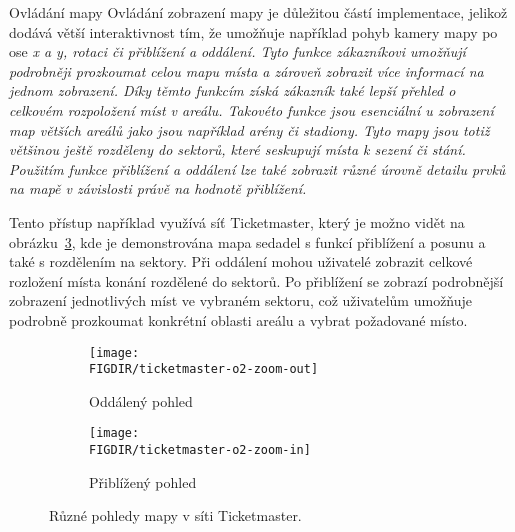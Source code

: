 \begin{subsection}{Ovládání mapy}
    \label{subsec:identifikace-interaktivni-mapa-ovladani}
    Ovládání zobrazení mapy je důležitou částí implementace, jelikož dodává větší interaktivnost tím, že umožňuje například pohyb kamery mapy po ose \em{x} a \em{y}, rotaci či přiblížení a oddálení.
    Tyto funkce zákazníkovi umožňují podrobněji prozkoumat celou mapu místa a zároveň zobrazit více informací na jednom zobrazení.
    Díky těmto funkcím získá zákazník také lepší přehled o celkovém rozpoložení míst v areálu.
    Takovéto funkce jsou esenciální u zobrazení map větších areálů jako jsou například arény či stadiony.
    Tyto mapy jsou totiž většinou ještě rozděleny do sektorů, které seskupují místa k sezení či stání.
    Použitím funkce přiblížení a oddálení lze také zobrazit různé úrovně detailu prvků na mapě v závislosti právě na hodnotě přiblížení.

    Tento přístup například využívá síť Ticketmaster, který je možno vidět na obrázku~\ref{fig:ticketmaster-o2-zoom}, kde je demonstrována mapa sedadel s funkcí přiblížení a posunu a také s rozdělením na sektory.
    Při oddálení mohou uživatelé zobrazit celkové rozložení místa konání rozdělené do sektorů.
    Po přiblížení se zobrazí podrobnější zobrazení jednotlivých míst ve vybraném sektoru, což uživatelům umožňuje podrobně prozkoumat konkrétní oblasti areálu a vybrat požadované místo.

    \begin{figure}[H]
        \centering
        \begin{subfigure}{0.45\textwidth}
            \texttt{[image: \\FIGDIR/ticketmaster-o2-zoom-out]}
            \caption{Oddálený pohled}
            \label{fig:ticketmaster-o2-zoom-in}
        \end{subfigure}
        \hfill
        \begin{subfigure}{0.45\textwidth}
            \texttt{[image: \\FIGDIR/ticketmaster-o2-zoom-in]}
            \caption{Přiblížený pohled}
            \label{fig:ticketmaster-o2-zoom-out}
        \end{subfigure}

        \caption{Různé pohledy mapy v síti Ticketmaster.\cite{t__www_ticketmaster_com}}
        \label{fig:ticketmaster-o2-zoom}
    \end{figure}


\end{subsection}
